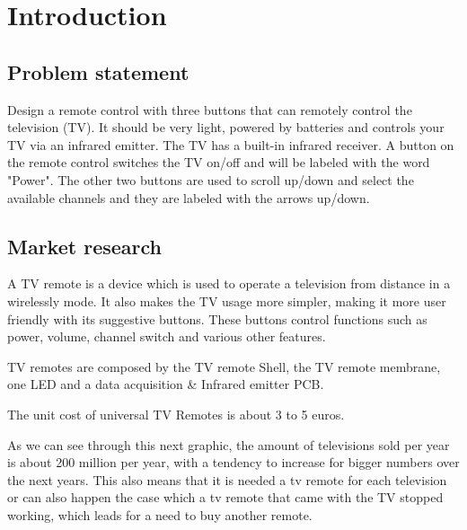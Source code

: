 %
%
%
\chapter{Introduction}%
\label{ch:introduction}

\section{Problem statement}
\label{sec:prob-stat}
    Design a remote control with three buttons that can
remotely control the television (TV). It should be very
light, powered by batteries and controls your TV via an
infrared emitter. The TV has a built-in infrared receiver. A
button on the remote control switches the TV on/off and
will be labeled with the word "Power". The other two
buttons are used to scroll up/down and select the available
channels and they are labeled with the arrows up/down.

\section{Market research}
\label{sec:market-research}
	A TV remote is a device which is used to operate a television from distance in a wirelessly mode. It also makes the TV usage more simpler, making it more user friendly with its suggestive buttons. These buttons control functions such as power, volume, channel switch and various other features.

TV remotes are composed by the TV remote Shell,
the TV remote membrane, one LED and a data acquisition \& Infrared emitter PCB.

The unit cost of universal TV Remotes is about 3 to 5 euros.

As we can see through this next graphic, the amount of televisions sold per year is about 200 million per year, with a tendency to increase for bigger numbers over the next years. This also means that it is needed a tv remote for each television or can also happen the case which a tv remote that came with the TV stopped working, which leads for a need to buy another remote.

